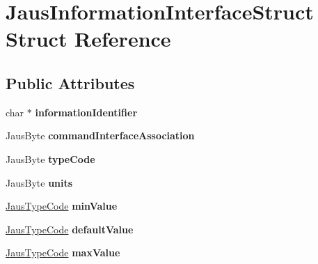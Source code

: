 \hypertarget{struct_jaus_information_interface_struct}{\section{\-Jaus\-Information\-Interface\-Struct \-Struct \-Reference}
\label{struct_jaus_information_interface_struct}
}
\subsection*{\-Public \-Attributes}
\begin{DoxyCompactItemize}
\item 
\hypertarget{struct_jaus_information_interface_struct_ada27c298c3ce901d3e427731afd8ce8d}{char $\ast$ {\bfseries information\-Identifier}}\label{struct_jaus_information_interface_struct_ada27c298c3ce901d3e427731afd8ce8d}

\item 
\hypertarget{struct_jaus_information_interface_struct_a55ce5ae48cc4cd9964b41ba239a699e5}{\-Jaus\-Byte {\bfseries command\-Interface\-Association}}\label{struct_jaus_information_interface_struct_a55ce5ae48cc4cd9964b41ba239a699e5}

\item 
\hypertarget{struct_jaus_information_interface_struct_a941966dd9ed9c7d45eae62d5697d57b4}{\-Jaus\-Byte {\bfseries type\-Code}}\label{struct_jaus_information_interface_struct_a941966dd9ed9c7d45eae62d5697d57b4}

\item 
\hypertarget{struct_jaus_information_interface_struct_afbab0a29923ac0e6a7dffb0db16fac28}{\-Jaus\-Byte {\bfseries units}}\label{struct_jaus_information_interface_struct_afbab0a29923ac0e6a7dffb0db16fac28}

\item 
\hypertarget{struct_jaus_information_interface_struct_acc2dc517d06fbdb57b42664a60afc4cb}{\hyperlink{union_jaus_type_code}{\-Jaus\-Type\-Code} {\bfseries min\-Value}}\label{struct_jaus_information_interface_struct_acc2dc517d06fbdb57b42664a60afc4cb}

\item 
\hypertarget{struct_jaus_information_interface_struct_a54aff76253c9cfe8a6643339714ad73c}{\hyperlink{union_jaus_type_code}{\-Jaus\-Type\-Code} {\bfseries default\-Value}}\label{struct_jaus_information_interface_struct_a54aff76253c9cfe8a6643339714ad73c}

\item 
\hypertarget{struct_jaus_information_interface_struct_a0b9af7d6819100ce48853def982d03d6}{\hyperlink{union_jaus_type_code}{\-Jaus\-Type\-Code} {\bfseries max\-Value}}\label{struct_jaus_information_interface_struct_a0b9af7d6819100ce48853def982d03d6}


\end{DoxyCompactItemize}
